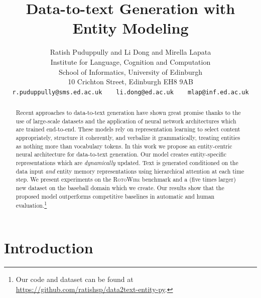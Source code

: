 \documentclass[11pt,a4paper]{article}
\title{Data-to-text Generation with Entity Modeling}
\author{Ratish Puduppully  \textnormal{and} Li Dong \textnormal{and} Mirella Lapata\\
Institute for Language, Cognition and Computation\\
School of Informatics, University of Edinburgh\\
 10 Crichton Street, Edinburgh EH8 9AB\\
\texttt{r.puduppully@sms.ed.ac.uk}~~~~\texttt{li.dong@ed.ac.uk}~~~~\texttt{mlap@inf.ed.ac.uk}\\
}
\date{}
\begin{document}
\maketitle
\begin{abstract}


  Recent approaches to data-to-text generation have shown great
  promise thanks to the use of large-scale datasets and the
  application of neural network architectures which are trained
  end-to-end. These models rely on representation learning to select
  content appropriately, structure it coherently, and verbalize it
  grammatically, treating entities as nothing more than vocabulary
  tokens. In this work we propose an entity-centric neural
  architecture for data-to-text generation. Our model creates
  entity-specific representations which are \emph{dynamically}
  updated.  Text is generated conditioned on the data input \emph{and}
  entity memory representations using hierarchical attention at each
  time step. We present experiments on the \textsc{RotoWire} benchmark
  and a (five times larger) new dataset on the baseball domain which
  we create. Our results show that the proposed model outperforms
  competitive baselines in automatic and human
  evaluation.\footnote{Our code and dataset can be found at
 \url{https://github.com/ratishsp/data2text-entity-py}.}
\end{abstract}

\section{Introduction}
\label{sec:introduction}
\end{document}
